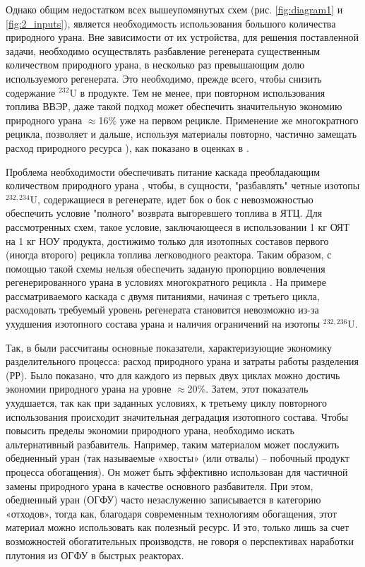 Однако общим недостатком всех вышеупомянутых схем (рис. \ref{fig:diagram1} и \ref{fig:2_inputs}), является необходимость использования большого количества природного урана.
Вне зависимости от их устройства, для решения поставленной задачи, необходимо осуществлять разбавление регенерата существенным количеством природного урана, в несколько раз превышающим долю используемого регенерата. Это необходимо, прежде всего, чтобы снизить содержание $^{232}$U в продукте.
Тем не менее, при повторном использования топлива ВВЭР, даже такой подход может обеспечить значительную экономию природного урана $\approx$16\% уже на первом рецикле.
Применение же многократного рецикла, позволяет и дальше, используя материалы повторно, частично замещать расход природного ресурса \cite{colemanEvaluationMultipleSelfrecycling2010}), как показано в оценках в \cite{smirnovEvolutionIsotopicComposition2012}.

Проблема необходимости обеспечивать питание каскада преобладающим количеством природного урана , чтобы, в сущности, "разбавлять" четные изотопы  $^{232,234}$U, содержащиеся в регенерате, идет бок о бок с невозможностью обеспечить условие "полного" возврата выгоревшего топлива в ЯТЦ.
Для рассмотренных схем, такое условие, заключающееся в использовании 1 кг ОЯТ на 1 кг НОУ продукта, достижимо только для изотопных составов первого (иногда второго) рецикла топлива легководного реактора.
Таким образом, с помощью такой схемы нельзя обеспечить заданую пропорцию вовлечения регенерированного урана в условиях многократного рецикла \cite{smirnovApplyingEnrichmentCapacities2018}.
На примере рассматриваемого каскада с двумя питаниями, начиная с третьего цикла, расходовать требуемый уровень регенерата становится невозможно из-за ухудшения изотопного состава урана и наличия ограничений на изотопы $^{232,236}$U.

Так, в \cite{smirnovApplyingEnrichmentCapacities2018} были рассчитаны основные показатели, характеризующие экономику разделительного процесса: расход природного урана и затраты работы разделения (РР).
Было показано, что для каждого из первых двух циклах можно достичь экономии природного урана на уровне $\approx$20\%. Затем, этот показатель ухудшается, так как при заданных условиях, к третьему циклу повторного использования происходит значительная деградация изотопного состава.
Чтобы повысить пределы экономии природного урана, необходимо искать альтернативный разбавитель. Например, таким материалом может послужить обедненный уран (так называемые «хвосты» (или отвалы) -- побочный продукт процесса обогащения).
Он может быть эффективно использован для частичной замены природного урана в качестве основного разбавителя.
При этом, обедненный уран (ОГФУ) часто незаслуженно записывается в категорию «отходов», тогда как, благодаря современным технологиям обогащения, этот материал можно использовать как полезный ресурс.
И это, только лишь за счет возможностей обогатительных производств, не говоря о перспективах наработки плутония из ОГФУ в быстрых реакторах.

